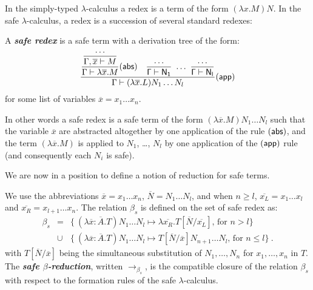 \documentclass{llncs}
\newcommand\defname[1]{{\bf\em #1}\index{#1}}
\newcommand\betasred{\rightarrow_{\beta_s}}
\newcommand\subst[2]{\left[ #1/#2 \right]}
\newcommand\rulef[2]{\frac{\dps #1}{\dps #2}}
\begin{document}
In the simply-typed $\lambda$-calculus a redex is a term of the form
$(\lambda x . M) N$. In the safe $\lambda$-calculus, a redex is a
succession of several standard redexes:
\begin{definition}\rm
A \defname{safe redex} is a safe term with a derivation tree of the form:
$$   \rulef{
            \rulef{\rulef{\ldots}{\Gamma, \overline{x}\vdash M}}{\Gamma \vdash \lambda \overline{x} . M} (\sf{abs})
            \quad
            \rulef{\ldots}{\Gamma \vdash N_1}  \ \ldots \  \rulef{\ldots}{\Gamma \vdash N_l}
    }
    {
       \Gamma \vdash (\lambda \overline{x} . L) N_1 \ldots N_l
    } (\sf{app})
$$
for some list of variables $\overline{x}=x_1\ldots x_n$.
\end{definition}

In other words a safe redex is a safe term of the form $(\lambda
\overline{x} . M) N_1 \ldots N_l$ such that the variable
$\overline{x}$ are abstracted altogether by one application of the
rule $(\sf{abs})$, and the term $(\lambda \overline{x} . M)$ is
applied to $N_1$, \ldots, $N_l$ by one application of the $(\sf{app})$
rule (and consequently each $N_i$ is safe).



We are now in a position to define a notion of reduction for safe terms.

\begin{definition}\rm
\label{dfn:safereduction} We use the
abbreviations $\overline{x} = x_1 \ldots x_n$,
$\overline{N} = N_1 \ldots N_l$, and when $n\geq l$, $\overline{x_L}
= x_1 \ldots x_l$ and $\overline{x_R} = x_{l+1} \ldots x_n$.
The relation $\beta_s$ is defined on the set of safe redex as:
\begin{eqnarray*}
  \beta_s &=&
  \{  \ (\lambda \overline{x} : \overline{A} . T) N_1 \ldots N_l \mapsto \lambda \overline{x_R}. T\subst{\overline{N}}{\overline{x_L}} \mbox{, for $n> l$}
  \} \\
  &\cup&
  \{ \ (\lambda \overline{x} : \overline{A} . T) N_1 \ldots N_l \mapsto T\subst{\overline{N}}{\overline{x}} N_{n+1} \ldots N_l
  \mbox{, for $n\leq l$} \} \ .
\end{eqnarray*}
with $T\subst{\overline{N}}{\overline{x}}$ being the simultaneous
substitution of $N_1,\ldots,N_n$ for $x_1, \ldots, x_n$ in $T$.  The
\defname{safe $\beta$-reduction}, written $\betasred$, is the
compatible closure of the relation $\beta_s$ with respect to the
formation rules of the safe $\lambda$-calculus.
\end{definition}
\end{document}
